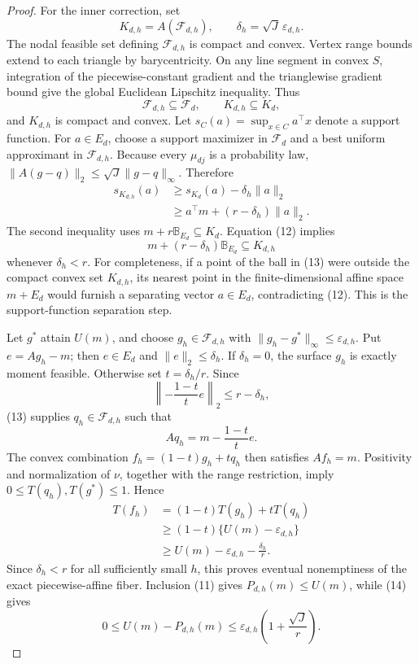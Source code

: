 \documentclass{article}
\begin{document}
\begin{proof}
For the inner correction, set
\[
 K_{d,h}=A(\mathcal F_{d,h}),
 \qquad
 \delta_h=\sqrt J\,\varepsilon_{d,h}.
\]
The nodal feasible set defining \(\mathcal F_{d,h}\) is compact and convex.
Vertex range bounds extend to each triangle by barycentricity.  On any line
segment in convex \(S\), integration of the piecewise-constant gradient and
the trianglewise gradient bound give the global Euclidean Lipschitz inequality.
Thus
\[
 \mathcal F_{d,h}\subseteq\mathcal F_d,
 \qquad K_{d,h}\subseteq K_d,                               \tag{11}
\]
and \(K_{d,h}\) is compact and convex.  Let \(s_C(a)=\sup_{x\in C}a^\top x\)
denote a support function.  For \(a\in E_d\), choose a support maximizer in
\(\mathcal F_d\) and a best uniform approximant in \(\mathcal F_{d,h}\).
Because every \(\mu_{dj}\) is a probability law,
\(\|A(g-q)\|_2\le\sqrt J\|g-q\|_\infty\).  Therefore
\begin{align}
 s_{K_{d,h}}(a)
 &\ge s_{K_d}(a)-\delta_h\|a\|_2\\
 &\ge a^\top m+(r-\delta_h)\|a\|_2.                        \tag{12}
\end{align}
The second inequality uses
\(m+r\mathbb B_{E_d}\subseteq K_d\).  Equation (12) implies
\[
 m+(r-\delta_h)\mathbb B_{E_d}\subseteq K_{d,h}             \tag{13}
\]
whenever \(\delta_h<r\).  For completeness, if a point of the ball in (13)
were outside the compact convex set \(K_{d,h}\), its nearest point in the
finite-dimensional affine space \(m+E_d\) would furnish a separating vector
\(a\in E_d\), contradicting (12).  This is the support-function separation
step.

Let \(g^*\) attain \(U(m)\), and choose
\(g_h\in\mathcal F_{d,h}\) with
\(\|g_h-g^*\|_\infty\le\varepsilon_{d,h}\).  Put
\(e=Ag_h-m\); then \(e\in E_d\) and \(\|e\|_2\le\delta_h\).  If
\(\delta_h=0\), the surface \(g_h\) is exactly moment feasible.  Otherwise set
\(t=\delta_h/r\).  Since
\[
 \left\|-\frac{1-t}{t}e\right\|_2
 \le r-\delta_h,
\]
(13) supplies \(q_h\in\mathcal F_{d,h}\) such that
\[
 Aq_h=m-\frac{1-t}{t}e.
\]
The convex combination \(f_h=(1-t)g_h+tq_h\) then satisfies
\(Af_h=m\).  Positivity and normalization of \(\nu\), together with the range
restriction, imply \(0\le T(q_h),T(g^*)\le1\).  Hence
\begin{align}
 T(f_h)
 &=(1-t)T(g_h)+tT(q_h)\\
 &\ge(1-t)\{U(m)-\varepsilon_{d,h}\}\\
 &\ge U(m)-\varepsilon_{d,h}-\frac{\delta_h}{r}.            \tag{14}
\end{align}
Since \(\delta_h<r\) for all sufficiently small \(h\), this proves eventual
nonemptiness of the exact piecewise-affine fiber.  Inclusion (11) gives
\(P_{d,h}(m)\le U(m)\), while (14) gives
\[
 0\le U(m)-P_{d,h}(m)
 \le\varepsilon_{d,h}\left(1+\frac{\sqrt J}{r}\right).     \tag{15}
\]


\end{proof}
\end{document}
